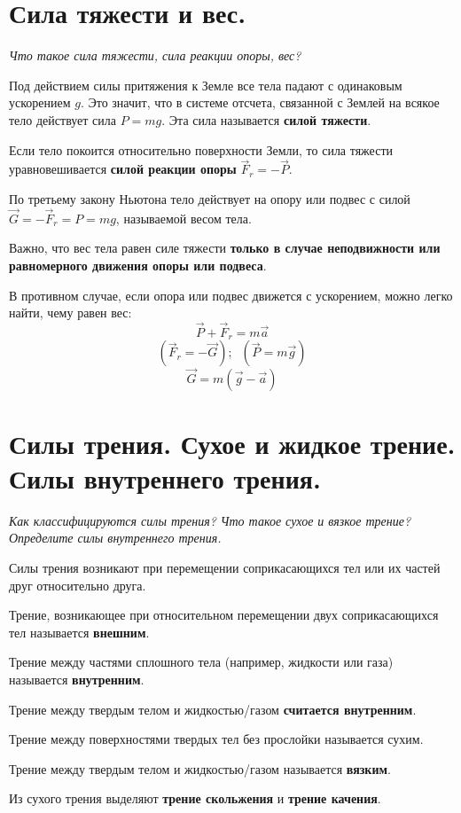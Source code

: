 \documentclass{article}
\begin{document}
  \section{Сила тяжести и вес.}
    \par
      \textit{Что такое сила тяжести, сила реакции опоры, вес?}\\    
    \par
      Под действием силы притяжения к Земле все тела падают с одинаковым ускорением $g$. Это значит, что в системе отсчета, связанной с Землей на всякое тело действует сила $P=mg$. Эта сила называется \textbf{силой тяжести}.
    \par
      Если тело покоится относительно поверхности Земли, то сила тяжести уравновешивается \textbf{силой реакции опоры} $\vec F_r=-\vec P$.
    \par
      По третьему закону Ньютона тело действует на опору или подвес с силой $\vec G=-\vec F_r=P=mg$, называемой весом тела.
    \par
      Важно, что вес тела равен силе тяжести \textbf{только в случае неподвижности или равномерного движения опоры или подвеса}.
    \par
      В противном случае, если опора или подвес движется с ускорением, можно легко найти, чему равен вес:
      \begin{equation}
	\vec P + \vec F_r = m\vec a
      \end{equation}
      \begin{equation}
	(\vec F_r=-\vec G);\;\;(\vec P=m\vec g)
      \end{equation}
      \begin{equation}
	\vec G=m(\vec g - \vec a)
      \end{equation}
  \clearpage      
    
  \section{Силы трения. Сухое и жидкое трение. Силы внутреннего трения.}
    \par
      \textit{Как классифицируются силы трения? Что такое сухое и вязкое трение? Определите силы внутреннего трения.}\\    
    \par    
      Силы трения возникают при перемещении соприкасающихся тел или их частей друг относительно друга.
    \par
      Трение, возникающее при относительном перемещении двух соприкасающихся тел называется \textbf{внешним}.
    \par
      Трение между частями сплошного тела (например, жидкости или газа) называется \textbf{внутренним}.
    \par
      Трение между твердым телом и жидкостью/газом \textbf{считается внутренним}.
    \par
      Трение между поверхностями твердых тел без прослойки называется сухим.
    \par
      Трение между твердым телом и жидкостью/газом называется \textbf{вязким}.
    \par
      Из сухого трения выделяют \textbf{трение скольжения} и \textbf{трение качения}.
\end{document}

